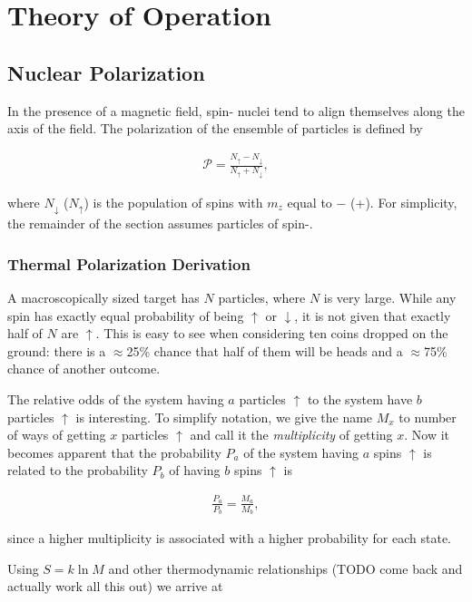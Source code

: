 \chapter{Theory of Operation} 
\label{theory}  
\section{Nuclear Polarization}
In the presence of a magnetic field, spin-\half{} nuclei tend to align themselves along the axis of the field.  The polarization of the ensemble of particles is defined by 

\begin{eqnarray}
\label{eqn:polarization-definition}
\mathcal{P}=\frac{N_\uparrow-N_\downarrow}{N_\uparrow+N_\downarrow},
\end{eqnarray}

where $N_\downarrow$ ($N_\uparrow$) is the population of spins with $m_z$ equal to $-$\half{} (+\half).  For simplicity, the remainder of the section assumes particles of spin-\half{}.

\subsection{Thermal Polarization Derivation}


A macroscopically sized target has $N$ particles, where $N$ is very large.  While any spin has exactly equal probability of being $\uparrow$ or $\downarrow$, it is not given that exactly half of $N$ are $\uparrow$.  This is easy to see when considering ten coins dropped on the ground: there is a $\approx$25\% chance that half of them will be heads and a $\approx$75\% chance of another outcome.


The relative odds of the system having $a$ particles $\uparrow$ to the system have $b$ particles $\uparrow$ is interesting.  To simplify notation, we give the name $M_x$ to number of ways of getting $x$ particles $\uparrow$ and call it the \textit{multiplicity} of getting $x$.  Now it becomes apparent that the probability $P_a$ of the system having $a$ spins $\uparrow$ is related to the probability $P_b$ of having $b$ spins $\uparrow$ is

\begin{eqnarray}
 \frac{P_a}{P_b} = \frac{M_a}{M_b},
\end{eqnarray}

since a higher multiplicity is associated with a higher probability for each state.

Using $S=k\ln M$ and other thermodynamic relationships (TODO come back and actually work all this out) we arrive at 

